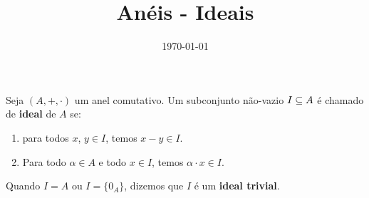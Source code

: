 \documentclass{beamer}
\title{Anéis - Ideais}
\author[\autor]{\autor}
\institute[\instituto]{\instituto}
\date{\today}
\begin{document}
    \begin{frame}
        \maketitle
    \end{frame}

    
    \begin{frame}
        \begin{definicao}
            Seja $(A, +, \cdot)$ um anel comutativo. Um subconjunto n\~ao-vazio $I \subseteq A$ {\'e} chamado de \textbf{ideal} de $A$ se:
            \begin{enumerate}[label={\roman*})]
                \item para todos $x$, $y \in I$, temos $x - y \in I$.
                \item Para todo $\alpha \in A$ e todo $x \in I$, temos $\alpha\cdot x \in I$.
            \end{enumerate}
        \end{definicao}

        \begin{observacao}
            Quando $I = A$ ou $I = \{0_A\}$, dizemos que $I$ {\'e} um \textbf{ideal trivial}.
        \end{observacao}
    \end{frame}
\end{document}
